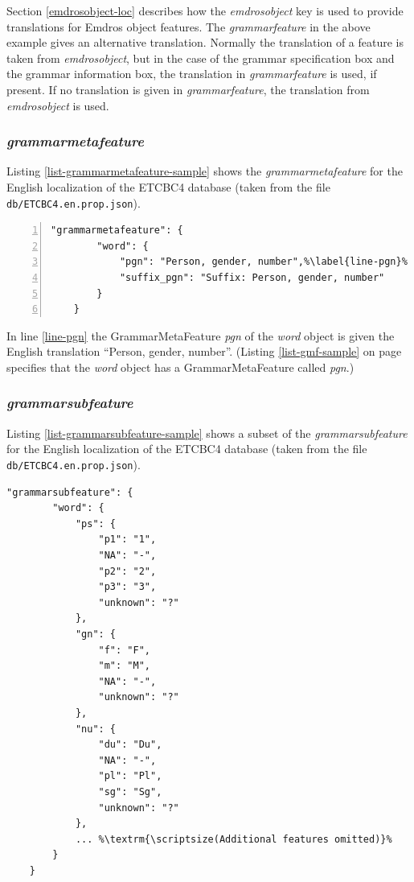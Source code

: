 \documentclass[11pt,oneside,a4paper]{memoir}
\begin{document}
Section \ref{emdrosobject-loc} describes how the \emph{emdrosobject} key is used to provide
translations for Emdros object features. The \emph{grammarfeature} in the above example gives an
alternative translation. Normally the translation of a feature is taken from \emph{emdrosobject},
but in the case of the grammar specification box and the grammar information box, the translation in
\emph{grammarfeature} is used, if present. If no translation is given in \emph{grammarfeature}, the
translation from \emph{emdrosobject} is used.


\subsubsection{\emph{grammarmetafeature}}

Listing \ref{list-grammarmetafeature-sample} shows the \emph{grammarmetafeature} for the English
localization of the ETCBC4 database (taken from the file \texttt{db/ETCBC4.en.prop.json}).

\begin{lstlisting}[numbers=left,caption=A sample grammarmetafeature value,label=list-grammarmetafeature-sample]
    "grammarmetafeature": {
        "word": {
            "pgn": "Person, gender, number",%\label{line-pgn}%
            "suffix_pgn": "Suffix: Person, gender, number"
        }
    }
\end{lstlisting}

In line \ref{line-pgn} the GrammarMetaFeature \emph{pgn} of the \emph{word} object is given the
English translation ``Person, gender, number''. (Listing \ref{list-gmf-sample} on page
\pageref{list-gmf-sample} specifies that the \emph{word} object has a GrammarMetaFeature called
\emph{pgn}.)

\subsubsection{\emph{grammarsubfeature}}

Listing \ref{list-grammarsubfeature-sample} shows a subset of the \emph{grammarsubfeature} for the
English localization of the ETCBC4 database (taken from the file \texttt{db/ETCBC4.en.prop.json}).

\begin{lstlisting}[caption=A sample grammarsubfeature value,label=list-grammarsubfeature-sample]
    "grammarsubfeature": {
        "word": {
            "ps": {
                "p1": "1",
                "NA": "-",
                "p2": "2",
                "p3": "3",
                "unknown": "?"
            },
            "gn": {
                "f": "F",
                "m": "M",
                "NA": "-",
                "unknown": "?"
            },
            "nu": {
                "du": "Du",
                "NA": "-",
                "pl": "Pl",
                "sg": "Sg",
                "unknown": "?"
            },
            ... %\textrm{\scriptsize(Additional features omitted)}%
        }
    }
\end{lstlisting}
\end{document}
